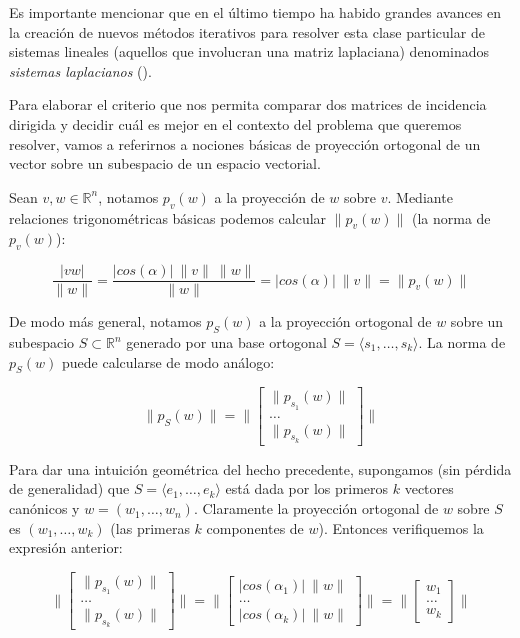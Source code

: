 \documentclass[conference,compsoc,a4paper]{IEEEtran}
\begin{document}
\smallskip

Es importante mencionar que en el último 
tiempo ha habido grandes avances en la creación de nuevos métodos 
iterativos para resolver esta clase particular de sistemas lineales 
(aquellos que involucran una matriz laplaciana) denominados 
\textit{sistemas laplacianos} (\cite{KMP:2010,Spielman:2010,ST:2004,
Teng:2010}).

\bigskip


Para elaborar el criterio que nos permita comparar dos matrices de 
incidencia dirigida y decidir cuál es mejor en el contexto del problema 
que queremos resolver, vamos a referirnos a nociones básicas de 
proyección ortogonal \cite{WK:2009} de un vector sobre un subespacio de un espacio 
vectorial.

\smallskip

Sean $v,w \in \mathbb{R}^n$, notamos $p_v(w)$ a la proyección de $w$ 
sobre $v$. Mediante relaciones trigonométricas básicas podemos 
calcular $\|p_v(w)\|$ (la norma de $p_v(w)$):

$$\frac{|v w|}{\|w\|} = \frac{|cos(\alpha)| \ \|v\| \ \|w\|}{\|w\|} = 
|cos(\alpha)| \ \|v\| = \|p_v(w)\|$$

De modo más general, notamos $p_S(w)$ a la proyección ortogonal de $w$
sobre un subespacio $S \subset \mathbb{R}^n$ generado por una base 
ortogonal $S = \langle s_1, \dots, s_k\rangle $. La norma de $p_S(w)$ puede calcularse
de modo análogo:

$$
\|p_S(w)\| = \|\begin{bmatrix}
	\|p_{s_1}(w)\| \\
	\dots \\
	\|p_{s_k}(w)\|
\end{bmatrix}\|
$$

\smallskip

Para dar una intuición geométrica del hecho precedente, supongamos (sin 
pérdida de generalidad) que $S = \langle e_1, \dots, e_k\rangle $ está dada por los 
primeros $k$ vectores canónicos y $w = (w_1, \dots, w_n)$. 
Claramente la proyección ortogonal de $w$ sobre $S$ es 
$(w_1, \dots, w_k)$ (las primeras $k$ componentes de $w$). Entonces 
verifiquemos la expresión anterior:

$$
\|\begin{bmatrix}
	\|p_{s_1}(w)\| \\	
	\dots \\
	\|p_{s_k}(w)\|
\end{bmatrix}\| = 
\|\begin{bmatrix}
	|cos(\alpha_1)| \ \|w\| \\
	\dots \\
	|cos(\alpha_k)| \ \|w\|
\end{bmatrix}\| = 
\|\begin{bmatrix}
	w_1 \\
	\dots \\
	w_k
\end{bmatrix}\|
$$
\end{document}
